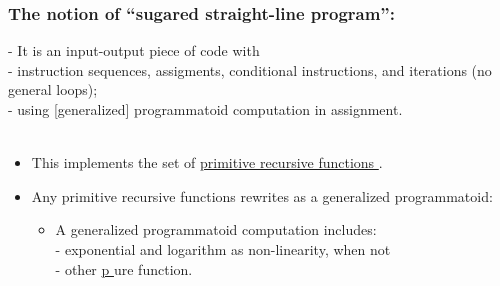 \documentclass{beamer}
\newcommand{\hrefc}[2]{\href{#1}{{#2 \CheckedBox}}}
\newcommand{\tab}{\hphantom{4mm}}
\begin{document}
\begin{frame}
  \frametitle{The notion of ``sugared straight-line program'':}
  - It is an input-output piece of code with \\ \tab - instruction sequences, assigments, conditional instructions, and iterations (no general loops); \\ \tab - using [generalized] programmatoid computation in assignment. \\~\\ \begin{itemize}
  \item This implements the set of \hrefc{https://en.wikipedia.org/wiki/Primitive_recursive_function}{primitive recursive functions}.
  \item Any primitive recursive functions rewrites as a generalized programmatoid:\begin{itemize}
  \item A generalized programmatoid computation includes: \\- exponential and logarithm as non-linearity, when not \\- other \hrefc{https://en.wikipedia.org/wiki/Pure_function} pure function.
\end{itemize}
\end{itemize}
\end{frame}
\end{document}
